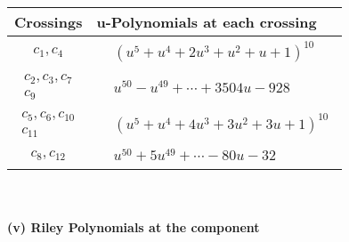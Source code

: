 \documentclass[1p]{elsarticle_modified}
\theoremstyle{definition}
\begin{document}
\begin{tabular}{m{50pt}|m{274pt}}
Crossings & \hspace{64pt}u-Polynomials at each crossing \\
\hline $$\begin{aligned}c_{1},c_{4}\end{aligned}$$&$\begin{aligned}
&(u^5+u^4+2 u^3+u^2+u+1)^{10}
\end{aligned}$\\
\hline $$\begin{aligned}c_{2},c_{3},c_{7}\\c_{9}\end{aligned}$$&$\begin{aligned}
&u^{50}- u^{49}+\cdots+3504 u-928
\end{aligned}$\\
\hline $$\begin{aligned}c_{5},c_{6},c_{10}\\c_{11}\end{aligned}$$&$\begin{aligned}
&(u^5+u^4+4 u^3+3 u^2+3 u+1)^{10}
\end{aligned}$\\
\hline $$\begin{aligned}c_{8},c_{12}\end{aligned}$$&$\begin{aligned}
&u^{50}+5 u^{49}+\cdots-80 u-32
\end{aligned}$\\
\hline
\end{tabular}\\~\\
\newpage\renewcommand{\arraystretch}{1}
\flushleft \textbf{(v) Riley Polynomials at the component}\newline \\
\end{document}
